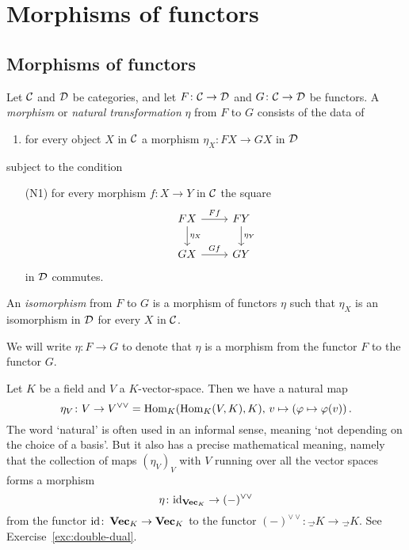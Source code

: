 
\chapter{Morphisms of functors}

\section{Morphisms of functors}


\begin{definition}
Let ${\mathcal{C}}$ and ${\mathcal{D}}$ be categories, and let $F\colon {\mathcal{C}}\to {\mathcal{D}}$ and $G\colon {\mathcal{C}} \to {\mathcal{D}}$ be functors. A \emph{morphism} or \emph{natural transformation} $\eta$ from $F$ to $G$ consists of the data of
\begin{enumerate}
\item for every object $X$ in ${\mathcal{C}}$ a morphism $\eta_X \colon FX \to GX$ in ${\mathcal{D}}$
\end{enumerate}
subject to the condition 
\begin{enumerate}
\item[(N1)]  for every morphism $f\colon X\to Y$ in ${\mathcal{C}}$ the square
\[
\begin{tikzcd}
FX \arrow{r}{Ff} \arrow{d}{\eta_X} & FY \arrow{d}{\eta_Y} \\
GX \arrow{r}{Gf} & GY
\end{tikzcd}
\]
in ${\mathcal{D}}$ commutes.
\end{enumerate}
An \emph{isomorphism} from $F$ to $G$ is a morphism of functors $\eta$ such that $\eta_X$ is an isomorphism in ${\mathcal{D}}$ for every $X$ in ${\mathcal{C}}$.
\end{definition}

We will  write $\eta\colon F\to G$ to denote that $\eta$ is a morphism from the functor $F$ to the functor $G$.

\begin{example}\label{exa:double-dual}
Let $K$ be a field and $V$ a $K$-vector-space. Then we have a natural map
\[
	\eta_V\colon V \to V^{\vee\vee} = \operatorname{Hom}_K(\operatorname{Hom}_K(V,K),K),\,
	v \mapsto \left( \varphi \mapsto \varphi(v) \right).
\]
The word `natural' is often used in an informal sense, meaning `not depending on the choice of a basis'. But it also has a precise mathematical meaning, namely that the collection of maps $(\eta_V)_V$ with $V$ running over all the vector spaces forms a morphism
\[
	\eta\colon {\rm id}_{\operatorname{{\bf{Vec}}}_K} \to (-)^{\vee\vee}
\]
from the functor ${\rm id}\colon \operatorname{{\bf{Vec}}}_K \to \operatorname{{\bf{Vec}}}_K$ to the functor $(-)^{\vee\vee}\colon \Vec_K \to \Vec_K$.
See Exercise~\ref{exc:double-dual}.
\end{example}

